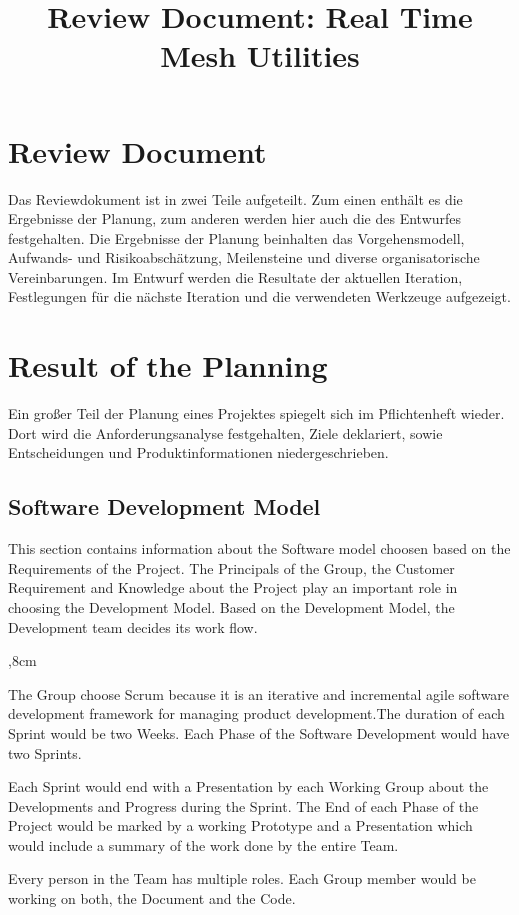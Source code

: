 \documentclass[a4paper, 11pt, ngerman, fleqn]{article}
\begin{document}
\title{Review Document: Real Time Mesh Utilities}
\vspace{3 in}
\maketitle
\clearpage

\section*{Review Document}
Das Reviewdokument ist in zwei Teile aufgeteilt. 
Zum einen enthält es die Ergebnisse der Planung, zum anderen werden hier auch die des Entwurfes festgehalten.
Die Ergebnisse der Planung beinhalten das Vorgehensmodell, Aufwands- und Risikoabschätzung, Meilensteine und diverse organisatorische Vereinbarungen. Im Entwurf werden die Resultate der aktuellen Iteration, Festlegungen für die nächste Iteration und die verwendeten Werkzeuge aufgezeigt.

\section{Result of the Planning}

Ein großer Teil der Planung eines Projektes spiegelt sich im Pflichtenheft wieder. Dort wird die Anforderungsanalyse festgehalten, Ziele deklariert, sowie Entscheidungen und Produktinformationen niedergeschrieben.

\subsection{Software Development Model}

This section contains information about the Software model choosen based on the Requirements of the Project.
The Principals of the Group, the Customer Requirement and Knowledge about the Project play an important role in choosing the Development Model. Based on the Development Model, the Development team decides its work flow. 

	\begin{description}
	,8cm
		\item[Agile Development Model: SCRUM] The Group choose Scrum because it is an iterative and incremental agile software development framework for managing product development.The duration of each Sprint would be two Weeks. Each Phase of the Software Development would have two Sprints. 
		
		Each Sprint would end with a Presentation by each Working Group about the Developments and Progress during the Sprint. The End of each Phase of the Project would be marked by a working Prototype and a Presentation which would include a summary of the work done by the entire Team. 
		
		\item[Projects specific Adaptation to the Model:] Every person in the Team has multiple roles. Each Group member would be working on both, the Document and the Code.
	\end{description} 
	
\end{document}
